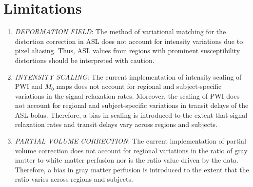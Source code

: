 \documentclass[letterpaper,11pt]{article}
\begin{document}
\section*{Limitations}
\begin{enumerate}
\item \emph{DEFORMATION FIELD}: The method of variational matching for the distortion correction in ASL does not account for intensity variations due to pixel aliasing. Thus, ASL values from regions with prominent susceptibility distortions should be interpreted with caution.\\

\item \emph{INTENSITY SCALING}: The current implementation of intensity scaling of PWI and $M_{0}$ maps does not account for regional and subject-specific variations in the signal relaxation rates. Moreover, the scaling of PWI does not account for regional and subject-specific variations in transit delays of the ASL bolus. Therefore, a bias in scaling is introduced to the extent that signal relaxation rates and transit delays vary across regions and subjects. \\

\item	\emph{PARTIAL VOLUME CORRECTION}: The current implementation of partial volume correction does not account for regional variations in the ratio of gray matter to white matter perfusion nor is the ratio value driven by the data. Therefore, a bias in gray matter perfusion is introduced to the extent that the ratio varies across regions and subjects. 
\end{enumerate}
\end{document}
